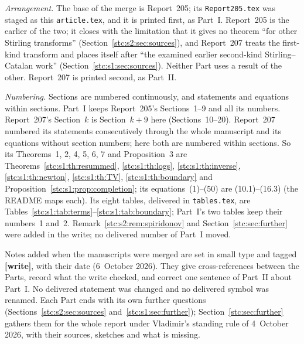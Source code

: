 \documentclass[11pt,letterpaper]{article}
\numberwithin{equation}{section}
\theoremstyle{remark}\newtheorem{remark}[theorem]{Remark}
\newcommand{\file}[1]{\nolinkurl{#1}}
\begin{document}
\emph{Arrangement.} The base of the merge is Report~205; its \file{Report205.tex} was staged as this \file{article.tex}, and it is printed first, as Part~I. Report~205 is the earlier of the two; it closes with the limitation that it gives no theorem ``for other Stirling transforms'' (Section~\ref{stc:s2:sec:sources}), and Report~207 treats the first-kind transform and places itself after ``the examined earlier second-kind Stirling--Catalan work'' (Section~\ref{stc:s1:sec:sources}). Neither Part uses a result of the other. Report~207 is printed second, as Part~II.

\emph{Numbering.} Sections are numbered continuously, and statements and equations within sections. Part~I keeps Report~205's Sections~1--9 and all its numbers. Report~207's Section~$k$ is Section~$k+9$ here (Sections~10--20). Report~207 numbered its statements consecutively through the whole manuscript and its equations without section numbers; here both are numbered within sections. So its Theorems~1, 2, 4, 5, 6, 7 and Proposition~3 are Theorems~\ref{stc:s1:th:resummed}, \ref{stc:s1:th:logs}, \ref{stc:s1:th:inverse}, \ref{stc:s1:th:newton}, \ref{stc:s1:th:TV}, \ref{stc:s1:th:boundary} and Proposition~\ref{stc:s1:prop:completion}; its equations~(1)--(50) are (10.1)--(16.3) (the README maps each). Its eight tables, delivered in \file{tables.tex}, are Tables~\ref{stc:s1:tab:terms}--\ref{stc:s1:tab:boundary}; Part~I's two tables keep their numbers~1 and~2. Remark~\ref{stc:s2:rem:spiridonov} and Section~\ref{stc:sec:further} were added in the write; no delivered number of Part~I moved.

Notes added when the manuscripts were merged are set in small type and tagged \textbf{[write]}, with their date (6~October 2026). They give cross-references between the Parts, record what the write checked, and correct one sentence of Part~II about Part~I. No delivered statement was changed and no delivered symbol was renamed. Each Part ends with its own further questions (Sections~\ref{stc:s2:sec:sources} and~\ref{stc:s1:sec:further}); Section~\ref{stc:sec:further} gathers them for the whole report under Vladimir's standing rule of 4~October 2026, with their sources, sketches and what is missing.
\end{document}
